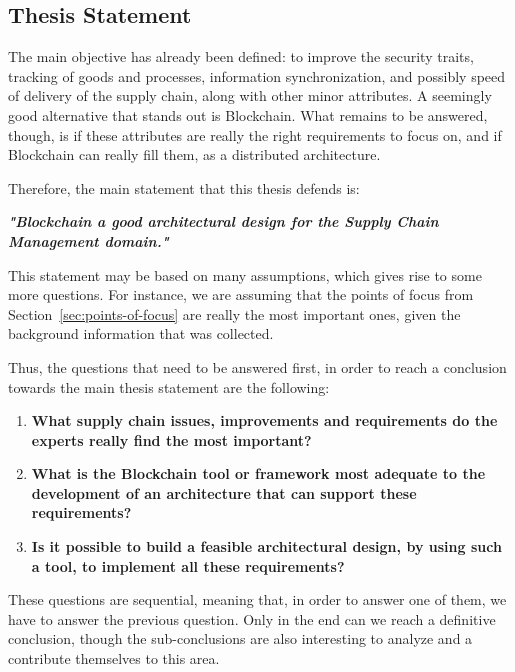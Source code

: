 \subsection{Thesis Statement}
\label{subsec:thesis-statement}
The main objective has already been defined: to improve the security traits, tracking of goods and processes, information synchronization, and possibly speed of delivery of the supply chain, along with other minor attributes. A seemingly good alternative that stands out is Blockchain. What remains to be answered, though, is if these attributes are really the right requirements to focus on, and if Blockchain can really fill them, as a distributed architecture.


Therefore, the main statement that this thesis defends is: 

\par \textbf{\textit{"Blockchain a good architectural design for the Supply Chain Management domain."}}

This statement may be based on many assumptions, which gives rise to some more questions. For instance, we are assuming that the points of focus from Section~\ref{sec:points-of-focus} are really the most important ones, given the background information that was collected.

Thus, the questions that need to be answered first, in order to reach a conclusion towards the main thesis statement are the following:
\begin{enumerate}
\item \textbf{What supply chain issues, improvements and requirements do the experts really find the most important?}
\item \textbf{What is the Blockchain tool or framework most adequate to the development of an architecture that can support these requirements?}
\item \textbf{Is it possible to build a feasible architectural design, by using such a tool, to implement all these requirements?}
\end{enumerate}

These questions are sequential, meaning that, in order to answer one of them, we have to answer the previous question. Only in the end can we reach a definitive conclusion, though the sub-conclusions are also interesting to analyze and a contribute themselves to this area.

